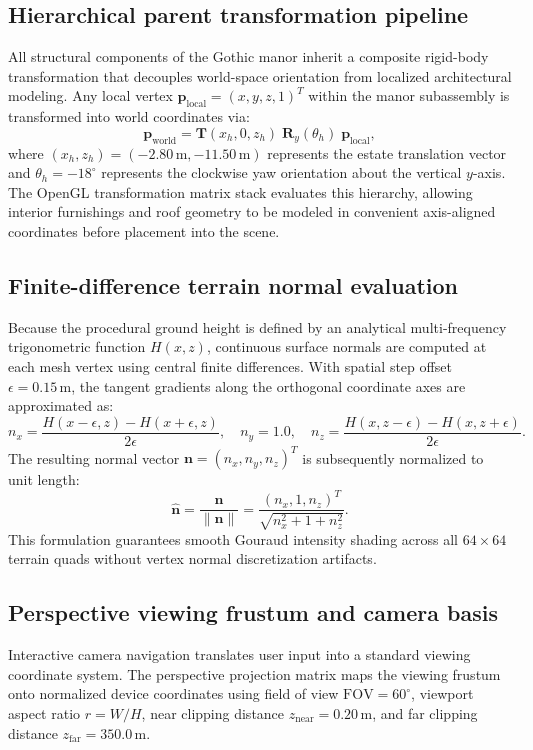 \documentclass[10pt,a4paper,oneside]{article}
\begin{document}
\subsection{Hierarchical parent transformation pipeline}
All structural components of the Gothic manor inherit a composite rigid-body transformation that decouples world-space orientation from localized architectural modeling. Any local vertex $\mathbf{p}_{\text{local}} = (x, y, z, 1)^T$ within the manor subassembly is transformed into world coordinates via:
\begin{equation}
\mathbf{p}_{\text{world}} = \mathbf{T}(x_h, 0, z_h) \; \mathbf{R}_y(\theta_h) \; \mathbf{p}_{\text{local}},
\end{equation}
where $(x_h, z_h) = (-2.80\,\mathrm{m}, -11.50\,\mathrm{m})$ represents the estate translation vector and $\theta_h = -18^\circ$ represents the clockwise yaw orientation about the vertical $y$-axis. The OpenGL transformation matrix stack evaluates this hierarchy, allowing interior furnishings and roof geometry to be modeled in convenient axis-aligned coordinates before placement into the scene.

\subsection{Finite-difference terrain normal evaluation}
Because the procedural ground height is defined by an analytical multi-frequency trigonometric function $H(x,z)$, continuous surface normals are computed at each mesh vertex using central finite differences. With spatial step offset $\epsilon = 0.15\,\mathrm{m}$, the tangent gradients along the orthogonal coordinate axes are approximated as:
\begin{equation}
n_x = \frac{H(x - \epsilon, z) - H(x + \epsilon, z)}{2\epsilon}, \quad
n_y = 1.0, \quad
n_z = \frac{H(x, z - \epsilon) - H(x, z + \epsilon)}{2\epsilon}.
\end{equation}
The resulting normal vector $\mathbf{n} = (n_x, n_y, n_z)^T$ is subsequently normalized to unit length:
\begin{equation}
\hat{\mathbf{n}} = \frac{\mathbf{n}}{\|\mathbf{n}\|} = \frac{(n_x, 1, n_z)^T}{\sqrt{n_x^2 + 1 + n_z^2}}.
\end{equation}
This formulation guarantees smooth Gouraud intensity shading across all $64 \times 64$ terrain quads without vertex normal discretization artifacts.

\subsection{Perspective viewing frustum and camera basis}
Interactive camera navigation translates user input into a standard viewing coordinate system. The perspective projection matrix maps the viewing frustum onto normalized device coordinates using field of view $\mathrm{FOV} = 60^\circ$, viewport aspect ratio $r = W/H$, near clipping distance $z_{\text{near}} = 0.20\,\mathrm{m}$, and far clipping distance $z_{\text{far}} = 350.0\,\mathrm{m}$.
\end{document}
